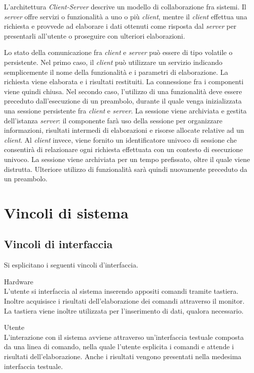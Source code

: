 L'architettura \emph{Client-Server} descrive un modello di collaborazione fra sistemi. Il \emph{server} offre servizi o funzionalità a uno o più \emph{client}, mentre il \emph{client} effettua una richiesta e provvede ad elaborare i dati ottenuti come risposta dal \emph{server} per presentarli all'utente o proseguire con ulteriori elaborazioni.

Lo stato della comunicazione fra \emph{client} e \emph{server} può essere di tipo volatile o persistente. Nel primo caso, il \emph{client} può utilizzare un servizio indicando semplicemente il nome della funzionalità e i parametri di elaborazione. La richiesta viene elaborata e i risultati restituiti. La connessione fra i componenti viene quindi chiusa. Nel secondo caso, l'utilizzo di una funzionalità deve essere preceduto dall'esecuzione di un preambolo, durante il quale venga inizializzata una sessione persistente fra \emph{client} e \emph{server}.
La sessione viene archiviata e gestita dell'istanza \emph{server}: il componente farà uso della sessione per organizzare informazioni, risultati intermedi di elaborazioni   e risorse allocate relative ad un \emph{client}. Al \emph{client} invece, viene fornito un identificatore univoco di sessione che consentirà di relazionare ogni richiesta effettuata con un contesto di esecuzione univoco. La sessione viene archiviata per un tempo prefissato, oltre il quale viene distrutta. Ulteriore utilizzo di funzionalità sarà quindi nuovamente preceduto da un preambolo.

\section{Vincoli di sistema}
\vincoliinit
\subsection{Vincoli di interfaccia}

Si esplicitano i seguenti vincoli d'interfaccia.
\vincolistart
	\item Hardware\\	
	L'utente si interfaccia al sistema inserendo appositi comandi tramite tastiera. Inoltre acquisisce i risultati dell'elaborazione dei comandi attraverso il monitor. La tastiera viene inoltre utilizzata per l'inserimento di dati, qualora necessario.
	
	\item Utente\\
	L'interazione con il sistema avviene attraverso un'interfaccia testuale composta da una linea di comando, nella quale l'utente esplicita i comandi e attende i risultati dell'elaborazione. Anche i risultati vengono presentati nella medesima interfaccia testuale.
	
